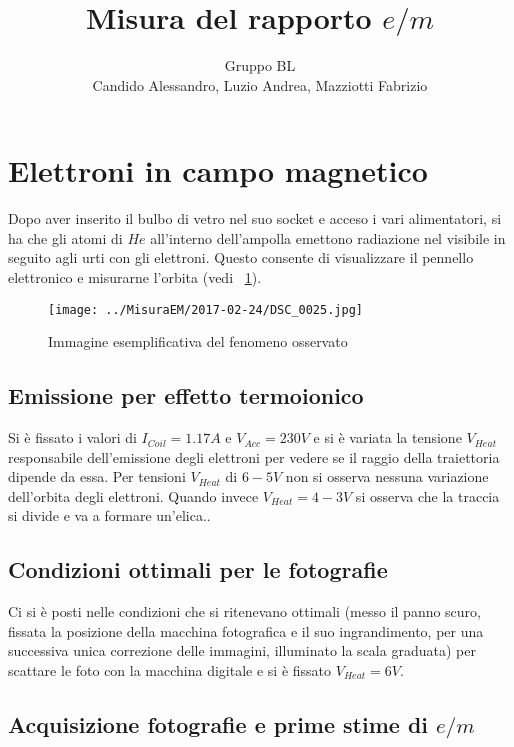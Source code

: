 \documentclass[10pt,a4paper]{article}
\title{Misura del rapporto $e/m$}
\author{Gruppo BL \\ Candido Alessandro, Luzio Andrea, Mazziotti Fabrizio}
\begin{document}
\maketitle

\section{Elettroni in campo magnetico}
Dopo aver inserito il bulbo di vetro nel suo socket e acceso i vari alimentatori, si ha che gli atomi di $He$ all'interno dell'ampolla emettono radiazione nel visibile in seguito agli urti con gli elettroni. Questo consente di visualizzare il pennello elettronico e misurarne l'orbita (vedi \figurename{~\ref{fig:ex1}}).

\begin{figure}[H]
	\centering
	\texttt{[image: ../MisuraEM/2017-02-24/DSC\_0025.jpg]}
	\caption{Immagine esemplificativa del fenomeno osservato}
	\label{fig:ex1}
\end{figure}

\subsection{Emissione per effetto termoionico}

Si è fissato i valori di $I_{Coil} = \unit{1.17}{A}$ e $V_{Acc} = \unit{230}{V}$ e si è variata la tensione $V_{Heat}$ responsabile dell'emissione degli elettroni per vedere se il raggio della traiettoria dipende da essa.
Per tensioni $V_{Heat}$ di $\unit{6-5}{V}$ non si osserva nessuna variazione dell'orbita degli elettroni. Quando invece $V_{Heat} = \unit{4-3}{V}$ si osserva che la traccia si divide e va a formare un'elica..

\subsection{Condizioni ottimali per le fotografie}

Ci si è posti nelle condizioni che si ritenevano ottimali (messo il panno scuro, fissata la posizione della macchina fotografica e il suo ingrandimento, per una successiva unica correzione delle immagini, illuminato la scala graduata) per scattare le foto con la macchina digitale e si è fissato $V_{Heat} = \unit{6}{V}$. 


\subsection{Acquisizione fotografie e prime stime di $e/m$}
\end{document}
